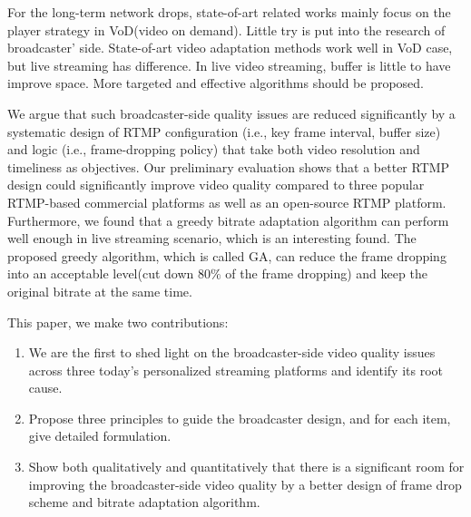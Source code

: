 For the long-term network drops, state-of-art related works mainly focus on the player strategy in VoD(video on demand). Little try is put into the research of broadcaster' side. State-of-art video adaptation methods work well in VoD case, but live streaming has difference. In live video streaming, buffer is little to have improve space. More targeted and effective algorithms should be proposed.

We argue that such broadcaster-side quality issues are reduced significantly
by a systematic design of RTMP configuration (i.e., key frame
interval, buffer size) and logic (i.e., frame-dropping policy) that take
both video resolution and timeliness as objectives.
Our preliminary evaluation shows that a better RTMP design
could significantly improve video quality compared to three popular
RTMP-based commercial  platforms as well as an open-source
RTMP platform.
Furthermore, we found that a greedy bitrate adaptation algorithm can perform well enough in live streaming scenario, which is an interesting found.
The proposed greedy algorithm, which is called GA, can reduce the frame dropping into an acceptable level(cut down $80\%$ of the frame dropping) and keep the original bitrate at the same time.



This paper, we make two contributions:
\begin{enumerate}
\item We are the first to shed light on the broadcaster-side video quality issues across three today's personalized streaming platforms and identify its root cause.
\item Propose three principles to guide the broadcaster design, and for each item, give detailed formulation.
\item Show both qualitatively and quantitatively that there is a significant room for improving the broadcaster-side video quality by a better design of frame drop scheme and bitrate adaptation algorithm.

\end{enumerate}



